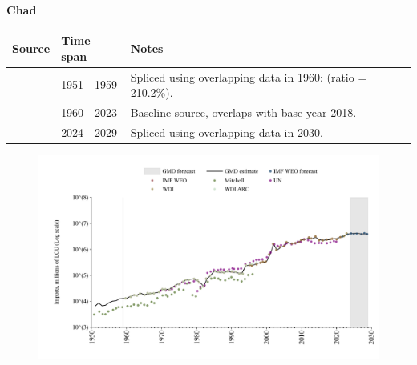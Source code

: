 \documentclass[12pt,a4paper,landscape]{article}
\begin{document}
\begin{adjustbox}{max totalsize={\paperwidth}{\paperheight},center}
\begin{minipage}[t][\textheight][t]{\textwidth}
\vspace*{0.5cm}
{}
\begin{center}
{\Large\bfseries Chad}
\end{center}
\vspace{0.5cm}
\begin{table}[H]
\centering
\small
\begin{tabular}{|l|l|l|}
\hline
\textbf{Source} & \textbf{Time span} & \textbf{Notes} \\
\hline
\rowcolor{white}\cite{Mitchell}& 1951 - 1959 &Spliced using overlapping data in 1960: (ratio = 210.2\%).\\
\rowcolor{lightgray}\cite{WDI}& 1960 - 2023 &Baseline source, overlaps with base year 2018.\\
\rowcolor{white}\cite{IMF_WEO_forecast}& 2024 - 2029 &Spliced using overlapping data in 2030.\\
\hline
\end{tabular}
\end{table}
\begin{figure}[H]
\centering
\includegraphics[width=\textwidth,height=0.6\textheight,keepaspectratio]{graphs/TCD_imports.pdf}
\end{figure}
\end{minipage}
\end{adjustbox}
\end{document}
